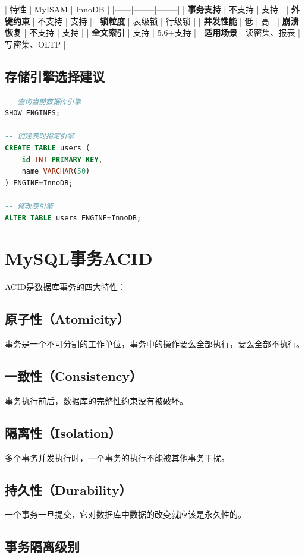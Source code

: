 \documentclass[12pt,UTF8]{ctexbook}
\begin{document}
| 特性 | MyISAM | InnoDB |
|------|--------|--------|
| \textbf{事务支持} | 不支持 | 支持 |
| \textbf{外键约束} | 不支持 | 支持 |
| \textbf{锁粒度} | 表级锁 | 行级锁 |
| \textbf{并发性能} | 低 | 高 |
| \textbf{崩溃恢复} | 不支持 | 支持 |
| \textbf{全文索引} | 支持 | 5.6+支持 |
| \textbf{适用场景} | 读密集、报表 | 写密集、OLTP |

\subsection*{存储引擎选择建议}

\begin{lstlisting}[language=sql]
-- 查询当前数据库引擎
SHOW ENGINES;

-- 创建表时指定引擎
CREATE TABLE users (
    id INT PRIMARY KEY,
    name VARCHAR(50)
) ENGINE=InnoDB;

-- 修改表引擎
ALTER TABLE users ENGINE=InnoDB;
\end{lstlisting}

\section{MySQL事务ACID}
\label{sec:acid}

ACID是数据库事务的四大特性：

\subsection*{原子性（Atomicity）}
事务是一个不可分割的工作单位，事务中的操作要么全部执行，要么全部不执行。

\subsection*{一致性（Consistency）}
事务执行前后，数据库的完整性约束没有被破坏。

\subsection*{隔离性（Isolation）}
多个事务并发执行时，一个事务的执行不能被其他事务干扰。

\subsection*{持久性（Durability）}
一个事务一旦提交，它对数据库中数据的改变就应该是永久性的。

\subsection*{事务隔离级别}
\end{document}
